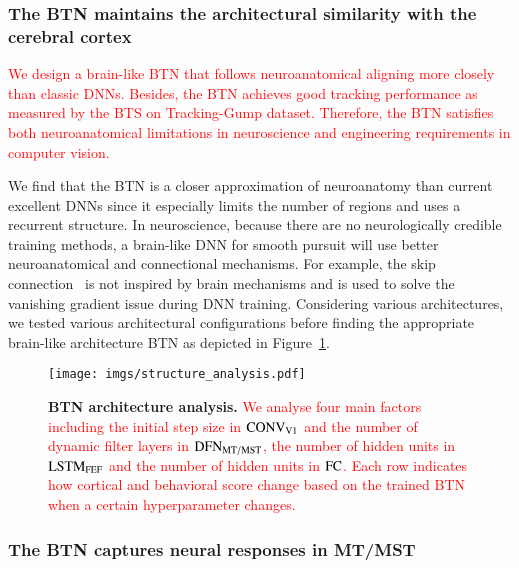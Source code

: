 \documentclass[final,3p,times,twocolumn]{elsarticle}
\begin{document}
\subsubsection{The BTN maintains the architectural similarity with the cerebral cortex}

\textcolor{red}{
We design a brain-like BTN that follows neuroanatomical aligning more closely than classic DNNs.
Besides, the BTN achieves good tracking performance as measured by the BTS on Tracking-Gump dataset.  
Therefore, the BTN satisfies both neuroanatomical limitations in neuroscience and engineering requirements in computer vision.}

We find that the BTN is a closer approximation of neuroanatomy than current excellent DNNs 
since it especially limits the number of regions and uses a recurrent structure. 
In neuroscience, because there are no neurologically credible training methods, 
a brain-like DNN for smooth pursuit will use better neuroanatomical and connectional mechanisms.
For example, the skip connection~\cite{he2016deep} is not inspired by brain mechanisms and is used to solve the vanishing gradient issue during DNN training.
Considering various architectures, we tested various architectural configurations before finding the appropriate brain-like architecture BTN as depicted in Figure~\ref{fig:structure_analysis}.


\begin{figure}
	\centering
	\texttt{[image: imgs/structure\_analysis.pdf]}
	\caption{\textbf{
		BTN architecture analysis.} 
		\textcolor{red}{
		We analyse four main factors including the initial step size in $\rm{CONV_{V1}}$ and the number of dynamic filter layers in $\rm{DFN_{MT/MST}}$, the number of hidden units in $\rm{LSTM_{FEF}}$ and the number of hidden units in $\rm{FC}$.
		Each row indicates how cortical and behavioral score change based on the trained BTN when a certain hyperparameter changes. 
		}
	}
	\label{fig:structure_analysis}
\end{figure}


\subsubsection{The BTN captures neural responses in MT/MST}
\label{sec:capture_neural}
\end{document}
